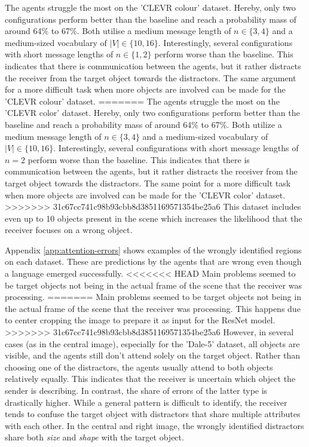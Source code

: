 \documentclass[11pt]{article}
\begin{document}
The agents struggle the most on the 'CLEVR colour' dataset.
Hereby, only two configurations perform better than the baseline and reach a probability mass of around 64\% to 67\%.
Both utilise a medium message length of $n \in \{3,4\}$ and a medium-sized vocabulary of $|V| \in \{10,16\}$.
Interestingly, several configurations with short message lengths of $n \in \{1,2\}$ perform worse than the baseline.
This indicates that there is communication between the agents, but it rather distracts the receiver from the target object towards the distractors.
The same argument for a more difficult task when more objects are involved can be made for the 'CLEVR colour' dataset.
=======
The agents struggle the most on the 'CLEVR color' dataset.
Hereby, only two configurations perform better than the baseline and reach a probability mass of around 64\% to 67\%.
Both utilize a medium message length of $n \in \{3,4\}$ and a medium-sized vocabulary of $|V| \in \{10,16\}$.
Interestingly, several configurations with short message lengths of $n=2$ perform worse than the baseline.
This indicates that there is communication between the agents, but it rather distracts the receiver from the target object towards the distractors.
The same point for a more difficult task when more objects are involved can be made for the 'CLEVR color' dataset.
>>>>>>> 31c67cc741c98b93cbb8d3851169571354be25a6
This dataset includes even up to 10 objects present in the scene which increases the likelihood that the receiver focuses on a wrong object.

Appendix \ref{app:attention-errors} shows examples of the wrongly identified regions on each dataset.
These are predictions by the agents that are wrong even though a language emerged successfully.
<<<<<<< HEAD
Main problems seemed to be target objects not being in the actual frame of the scene that the receiver was processing. %
=======
Main problems seemed to be target objects not being in the actual frame of the scene that the receiver was processing.
This happens due to center cropping the image to prepare it as input for the ResNet model. %
>>>>>>> 31c67cc741c98b93cbb8d3851169571354be25a6
However, in several cases (as in the central image), especially for the 'Dale-5' dataset, all objects are visible, and the agents still don't attend solely on the target object.
Rather than choosing one of the distractors, the agents usually attend to both objects relatively equally.
This indicates that the receiver is uncertain which object the sender is describing.
In contrast, the share of errors of the latter type is drastically higher.
While a general pattern is difficult to identify, the receiver tends to confuse the target object with distractors that share multiple attributes with each other.
In the central and right image, the wrongly identified distractors share both \emph{size} and \emph{shape} with the target object.
\end{document}
